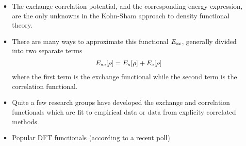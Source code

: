 \documentclass[slidestop,mathserif,compress,xcolor=svgnames]{beamer}
\begin{document}
\begin{frame}
\footnotesize{
\begin{columns}
\column{12cm}
\begin{itemize}
\item The exchange-correlation potential, and the corresponding energy expression, are the only unknowns in the Kohn-Sham approach to density functional theory. 
%
\item There are many ways to approximate this functional $E_{\rm xc}$, generally divided into two separate terms
\begin{align*}
E_{\rm xc}[\rho] = E_{\rm x}[\rho] + E_{\rm c}[\rho]
\end{align*}
where the first term is the exchange functional while the second term is the correlation functional.
\item Quite a few research groups have developed the exchange and correlation functionals which are fit to empirical data or data from explicity correlated methods.
\item Popular DFT functionals (according to a recent poll)
\end{itemize}
\end{columns}
}
\end{frame}
\end{document}
